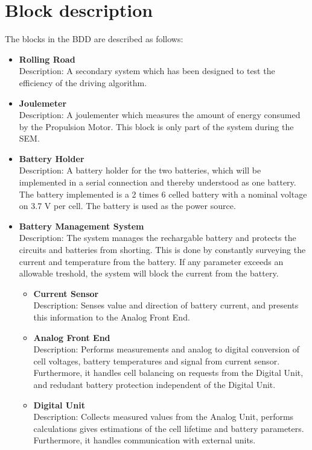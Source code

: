 \section{Block description}
The blocks in the BDD are described as follows:

\begin{itemize}
	\item \textbf{Rolling Road}\\
	Description: A secondary system which has been designed to test the efficiency of the driving algorithm.
	\item \textbf{Joulemeter}\\
	Description: A joulementer which measures the amount of energy consumed by the Propulsion Motor. This block is only part of the system during the SEM.
	\item \textbf{Battery Holder}\\
	Description: A battery holder for the two batteries, which will be implemented in a serial connection and thereby understood as one battery. The battery implemented is a 2 times 6 celled battery with a nominal voltage on 3.7 V per cell. The battery is used as the power source.
	\item \textbf{Battery Management System}\\
	Description: The system manages the rechargable battery and protects the circuits and batteries from shorting. This is done by constantly surveying the current and temperature from the battery. If any parameter exceeds an allowable treshold, the system will block the current from the battery.
	\begin{itemize}
		\item \textbf{Current Sensor}\\
		Description: Senses value and direction of battery current, and presents this information to the Analog Front End.
		\item \textbf{Analog Front End}\\
		Description: Performs measurements and analog to digital conversion of cell voltages, battery temperatures and signal from current sensor. Furthermore, it handles cell balancing on requests from the Digital Unit, and redudant battery protection independent of the Digital Unit.
		\item \textbf{Digital Unit}\\
		Description: Collects measured values from the Analog Unit, performs calculations gives estimations of the cell lifetime and battery parameters. Furthermore, it handles communication with external units.

\end{itemize}
\end{itemize}
